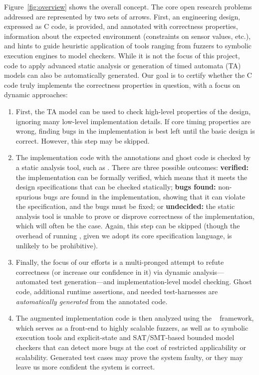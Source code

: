 Figure~\ref{fig:overview} shows the overall concept.  The core
open research problems addressed are represented by two sets of
arrows.  First, an engineering design, expressed as C code, is
provided, and annotated with correctness properties, information
about the expected environment (constraints on sensor values, etc.),
and hints to guide heuristic application of tools ranging from fuzzers
to symbolic execution engines to model checkers.
While it is not the focus of this project, code to apply advanced static analysis or generation of timed
automata (TA) models can also be automatically generated.  
Our goal is to certify whether the C code truly implements the
correctness properties in question, with a focus on dynamic approaches:
\begin{enumerate}[labelsep=3pt,leftmargin=12pt]
\item First, the TA model can be used to check high-level properties
  of the design, ignoring many low-level implementation details.  If
  core timing properties are wrong, finding bugs in the implementation
  is best left until the basic design is correct.  However, this step
  may be skipped.
\item The implementation code with the \acsl annotations and ghost code
  is checked by a static analysis tool, such as \framac.
  There are three possible outcomes:
  {\bf verified:} the implementation can be formally verified, which
  means that it meets the design specifications that can be checked statically;
  {\bf bugs found:} non-spurious bugs are found in the implementation, showing that
    it can violate the specification, and the bugs must be fixed; or
  {\bf undecided:} the static analysis tool is unable to prove or
  disprove correctness of the implementation, which will often be the
  case.  Again, this step can be skipped (though the overhead of
  running \framac, given we adopt its core specification language, is
  unlikely to be prohibitive).
\item Finally, the focus of our efforts is a multi-pronged attempt to refute correctness (or increase our confidence
  in it) via dynamic analysis---automated test generation---and
  implementation-level model checking.
  Ghost code, additional runtime assertions, and needed test-harnesses are \emph{automatically generated} from the
  annotated code.
\item The augmented implementation code is then analyzed using the
  \deepstate~\cite{DeepState} framework, which serves as a front-end
  to highly scalable fuzzers, as well as to symbolic execution tools
  and explicit-state and SAT/SMT-based bounded model checkers that can
  detect more bugs at the cost of restricted applicability or scalability.  Generated test cases may
  prove the system faulty, or they may leave us more confident
  the system is correct.
\end{enumerate}

